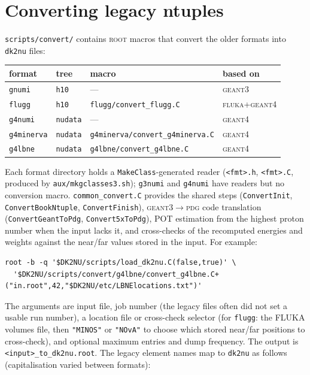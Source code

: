 \documentclass[11pt]{article}
\newcommand{\code}[1]{\texttt{#1}}
\newcommand{\geant}{\textsc{geant}\xspace}
\newcommand{\ROOT}{\textsc{root}\xspace}
\newcommand{\dktwonu}{\texttt{dk2nu}\xspace}
\begin{document}
\section{Converting legacy ntuples}\label{app:convert}

\code{scripts/convert/} contains \ROOT macros that convert the older
formats into \dktwonu files:

\begin{center}\small
\begin{tabular}{llll}
\toprule
\textbf{format} & \textbf{tree} & \textbf{macro} & \textbf{based on} \\ \midrule
\code{gnumi}     & \code{h10}    & ---                            & \geant{}3 \\
\code{flugg}     & \code{h10}    & \code{flugg/convert\_flugg.C}  & \textsc{fluka}+\geant{}4 \\
\code{g4numi}    & \code{nudata} & ---                            & \geant{}4 \\
\code{g4minerva} & \code{nudata} & \code{g4minerva/convert\_g4minerva.C} & \geant{}4 \\
\code{g4lbne}    & \code{nudata} & \code{g4lbne/convert\_g4lbne.C} & \geant{}4 \\
\bottomrule
\end{tabular}
\end{center}
Each format directory holds a \code{MakeClass}-generated reader
(\code{<fmt>.h}, \code{<fmt>.C}, produced by
\code{aux/mkgclasses3.sh}); \code{g3numi} and \code{g4numi} have readers
but no conversion macro.  \code{common\_convert.C} provides the shared
steps (\code{ConvertInit}, \code{ConvertBookNtuple},
\code{ConvertFinish}), \geant{}3$\to$\textsc{pdg} code translation
(\code{ConvertGeantToPdg}, \code{Convert5xToPdg}), POT estimation from
the highest proton number when the input lacks it, and cross-checks of the
recomputed energies and weights against the near/far values stored in the
input.  For example:
\begin{lstlisting}[style=plain]
root -b -q '$DK2NU/scripts/load_dk2nu.C(false,true)' \
  '$DK2NU/scripts/convert/g4lbne/convert_g4lbne.C+("in.root",42,"$DK2NU/etc/LBNElocations.txt")'
\end{lstlisting}
The arguments are input file, job number (the legacy files often did not
set a usable run number), a location file or cross-check selector (for
\code{flugg}: the FLUKA volumes file, then \code{"MINOS"} or \code{"NOvA"}
to choose which stored near/far positions to cross-check), and optional
maximum entries and dump frequency.  The output is
\code{<input>\_to\_dk2nu.root}.  The legacy element names map to \dktwonu
as follows (capitalisation varied between formats):
\end{document}
